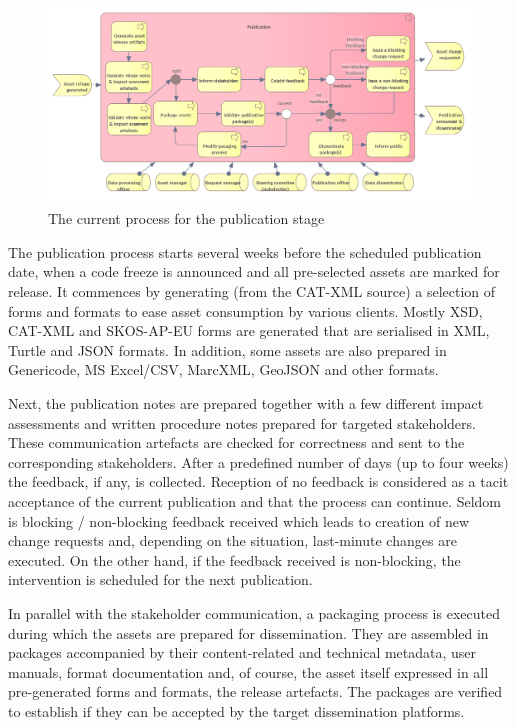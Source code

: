 	\label{sec:publication-current}
		\begin{figure}[h]
		\centering
		\includegraphics[width=1.03\textwidth]{images/business/current/Publication.png}
		\caption{The current process for the publication stage}
		\label{fig:publication-current}
	\end{figure}

	The publication process starts several weeks before the scheduled publication date, when a code freeze is announced and all pre-selected assets are marked for release. It commences by generating (from the CAT-XML source) a selection of forms and formats to ease asset consumption by various clients. Mostly XSD, CAT-XML and SKOS-AP-EU forms are generated that are serialised in XML, Turtle and JSON formats. In addition, some assets are also prepared in Genericode, MS Excel/CSV, MarcXML, GeoJSON and other formats. 
	
	Next, the publication notes are prepared together with a few different impact assessments and written procedure notes prepared for targeted stakeholders. These communication artefacts are checked for correctness and sent to the corresponding stakeholders. After a predefined number of days (up to four weeks) the feedback, if any, is collected. Reception of no feedback is considered as a tacit acceptance of the current publication and that the process can continue. Seldom is blocking / non-blocking feedback received which leads to creation of new change requests and, depending on the situation, last-minute changes are executed. On the other hand, if the feedback received is non-blocking, the intervention is scheduled for the next publication. 
	
	\enlargethispage{1em}
	
	In parallel with the stakeholder communication, a packaging process is executed during which the assets are prepared for dissemination. They are assembled in packages accompanied by their content-related and technical metadata, user manuals, format documentation and, of course, the asset itself expressed in all pre-generated forms and formats, the release artefacts. The packages are verified to establish if they can be accepted by the target dissemination platforms.
	
